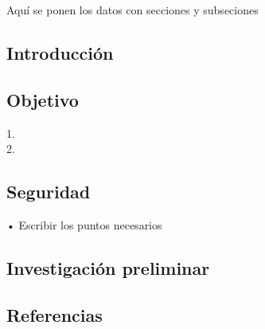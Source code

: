 
Aquí se ponen los datos con secciones y subseciones

\subsection{Introducción }


\subsection{Objetivo}


1.	\\
2.  \\


\subsection{Seguridad}


• Escribir los puntos necesarios

\subsection{Investigación preliminar}


\subsection{Referencias}